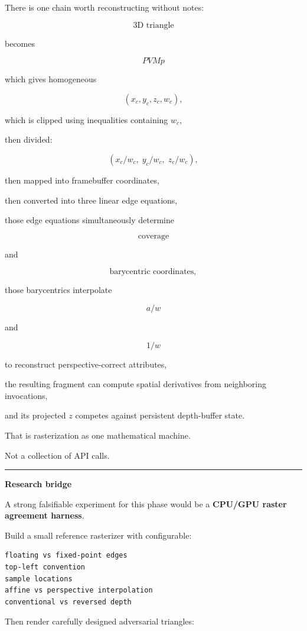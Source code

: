 There is one chain worth reconstructing without notes:

\[
\boxed{
\text{3D triangle}
}
\]

becomes

\[
\boxed{
PVMp
}
\]

which gives homogeneous

\[
(x_c,y_c,z_c,w_c),
\]

which is clipped using inequalities containing \(w_c\),

then divided:

\[
(x_c/w_c,\;y_c/w_c,\;z_c/w_c),
\]

then mapped into framebuffer coordinates,

then converted into three linear edge equations,

those edge equations simultaneously determine

\[
\text{coverage}
\]

and

\[
\text{barycentric coordinates},
\]

those barycentrics interpolate

\[
a/w
\]

and

\[
1/w
\]

to reconstruct perspective-correct attributes,

the resulting fragment can compute spatial derivatives from neighboring invocations,

and its projected \(z\) competes against persistent depth-buffer state.

That is rasterization as one mathematical machine.

Not a collection of API calls.

\begin{center}\rule{0.5\linewidth}{0.5pt}\end{center}

\textbf{Research bridge}

A strong falsifiable experiment for this phase would be a \textbf{CPU/GPU raster agreement harness}.

Build a small reference rasterizer with configurable:

\begin{verbatim}
floating vs fixed-point edges
top-left convention
sample locations
affine vs perspective interpolation
conventional vs reversed depth
\end{verbatim}

Then render carefully designed adversarial triangles:

